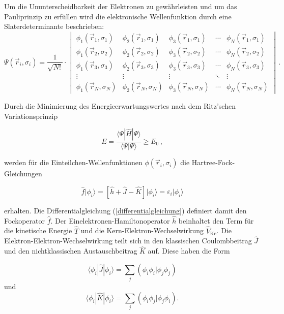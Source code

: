 Um die Ununterscheidbarkeit der Elektronen zu gewährleisten und um das Pau\-li\-prin\-zip\supercite{pauli1925zusammenhang} zu erfüllen wird die elektronische Wellenfunktion durch eine Sla\-ter\-de\-ter\-mi\-nan\-te\supercite{slater1974self} beschrieben:
\begin{equation}
\Psi(\vec{r}_i,\sigma_i)=\frac{1}{\sqrt{N!}}\cdot\begin{vmatrix}
\phi_1(\vec{r}_1,\sigma_1) & \phi_2(\vec{r}_1,\sigma_1) & \phi_3(\vec{r}_1,\sigma_1) &\cdots & \phi_N(\vec{r}_1,\sigma_1) \\
\phi_1(\vec{r}_2,\sigma_2) & \phi_2(\vec{r}_2,\sigma_2) & \phi_3(\vec{r}_2,\sigma_2) &\cdots & \phi_N(\vec{r}_2,\sigma_2) \\
\phi_1(\vec{r}_3,\sigma_3) & \phi_2(\vec{r}_3,\sigma_3) & \phi_3(\vec{r}_3,\sigma_3) &\cdots & \phi_N(\vec{r}_3,\sigma_3) \\
\vdots & \vdots & \vdots & \ddots & \vdots\\
\phi_1(\vec{r}_N,\sigma_N) & \phi_2(\vec{r}_N,\sigma_N) & \phi_3(\vec{r}_N,\sigma_N) &\cdots & \phi_N(\vec{r}_N,\sigma_N)
\end{vmatrix}\, .
\end{equation}

Durch die Minimierung des Energieerwartungswertes nach dem Ritz'schen Va\-ria\-ti\-ons\-prin\-zip\supercite{macdonald1933successive}

\begin{equation}
E=\frac{\langle\Psi|\hat{H}|\Psi\rangle}{\langle\Psi|\Psi\rangle}\geq E_0\, ,
\end{equation}

werden für die Einteilchen-Wellenfunktionen $\phi(\vec{r}_i,\sigma_i)$ die Hartree-Fock-Gleichungen

\begin{equation}
\hat{f}\vert\phi_i\rangle=\left[\hat{h}+\hat{J}-\hat{K}\right]\vert\phi_i\rangle=\varepsilon_i\vert\phi_i\rangle
\label{differentialgleichung}
\end{equation}

erhalten. Die Differentialgleichung (\ref{differentialgleichung}) definiert damit den Fockoperator $\hat{f}$. Der Einelektronen-Hamiltonoperator $\hat{h}$ beinhaltet den Term für die kinetische Energie $\hat{T}$ und die Kern-Elektron-Wechselwirkung $\hat{V}_{\text{Ke}}$. Die Elektron-Elektron-Wechselwirkung teilt sich in den klassischen Coulombbeitrag $\hat{J}$ und den nichtklassischen Austauschbeitrag $\hat{K}$ auf. Diese haben die Form

\begin{equation}
\langle\phi_i|\hat{J}|\phi_i\rangle=\sum_j\left(\phi_i\phi_i|\phi_j\phi_j\right)
\end{equation}
und 
\begin{equation}
\langle\phi_i|\hat{K}|\phi_i\rangle=\sum_j\left(\phi_i\phi_j|\phi_j\phi_i\right).
\end{equation}

